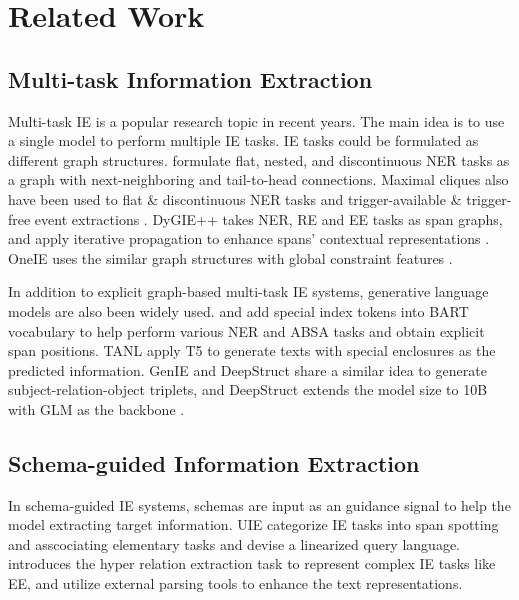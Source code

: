 \section{Related Work}

\subsection{Multi-task Information Extraction}

Multi-task IE is a popular research topic in recent years.
The main idea is to use a single model to perform multiple IE tasks.
IE tasks could be formulated as different graph structures.
\citet{w2ner} formulate flat, nested, and discontinuous NER tasks as a graph with next-neighboring and tail-to-head connections.
Maximal cliques also have been used to flat \& discontinuous NER tasks \cite{mac-discontinuous-ner} and trigger-available \& trigger-free event extractions \cite{ptpcg}.
DyGIE++ takes NER, RE and EE tasks as span graphs, and apply iterative propagation to enhance spans' contextual representations \cite{dygiepp}.
OneIE uses the similar graph structures with global constraint features \cite{oneie}.

In addition to explicit graph-based multi-task IE systems, generative language models are also been widely used.
\citet{bart-ner} and \citet{bart-absa} add special index tokens into BART \cite{bart} vocabulary to help perform various NER and ABSA tasks and obtain explicit span positions.
TANL \cite{tanl} apply T5 \cite{t5} to generate texts with special enclosures as the predicted information.
GenIE \cite{genie} and DeepStruct \cite{deepstruct} share a similar idea to generate subject-relation-object triplets, and DeepStruct extends the model size to 10B with GLM as the backbone \cite{glm}.

\subsection{Schema-guided Information Extraction}

In schema-guided IE systems, schemas are input as an guidance signal to help the model extracting target information.
UIE \cite{uie} categorize IE tasks into span spotting and asscociating elementary tasks and devise a linearized query language.
\citet{lasuie} introduces the hyper relation extraction task to represent complex IE tasks like EE, and utilize external parsing tools to enhance the text representations.

